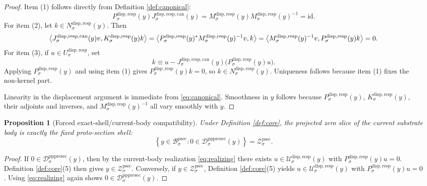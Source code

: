 \documentclass[11pt]{article}
\newcommand{\ProtoSectionBody}[1]{\mathcal B_{#1}^{\mathrm{psec}}}
\newcommand{\ProtoSectionShell}[1]{\mathcal Z_{#1}^{\mathrm{psec}}}
\newcommand{\PrePreProtoSectionResidualBody}[1]{\mathcal D_{#1}^{\mathrm{pppresec}}}
\newcommand{\SubstrateCarrier}[1]{U_{#1}^{\mathrm{disp,resp}}}
\newcommand{\SubstrateBody}[1]{\mathcal U_{#1}^{\mathrm{disp,resp}}}
\newcommand{\SubstrateProjection}[1]{P_{#1}^{\mathrm{disp,resp}}}
\newcommand{\SubstrateOperator}[1]{K_{#1}^{\mathrm{disp,resp}}}
\newcommand{\SubstrateKernel}[1]{N_{#1}^{\mathrm{disp,resp}}}
\newcommand{\CanonicalLift}[1]{J_{#1}^{\mathrm{disp,resp,can}}}
\newcommand{\SchurResponse}[1]{M_{#1}^{\mathrm{disp,resp}}}
\newtheorem{proposition}{Proposition}
\begin{document}
\begin{proof}
Item (1) follows directly from Definition \ref{def:canonical}:
\[
\SubstrateProjection{\sigma}(y)\CanonicalLift{\sigma}(y)
=
\SchurResponse{\sigma}(y)\SchurResponse{\sigma}(y)^{-1}
=
\mathrm{id}.
\]
For item (2), let \(k\in\SubstrateKernel{\sigma}(y)\). Then
\[
\ev{
\CanonicalLift{\sigma}(y)v,
\SubstrateOperator{\sigma}(y)k
}
=
\ev{
\SubstrateProjection{\sigma}(y)^*
\SchurResponse{\sigma}(y)^{-1}v,
k
}
=
\ev{
\SchurResponse{\sigma}(y)^{-1}v,
\SubstrateProjection{\sigma}(y)k
}
=
0.
\]
For item (3), if \(u\in\SubstrateCarrier{\sigma}\), set
\[
k
\equiv
u-\CanonicalLift{\sigma}(y)\bigl(\SubstrateProjection{\sigma}(y)u\bigr).
\]
Applying \(\SubstrateProjection{\sigma}(y)\) and using item (1) gives \(\SubstrateProjection{\sigma}(y)k=0\), so \(k\in\SubstrateKernel{\sigma}(y)\). Uniqueness follows because item (1) fixes the non-kernel part.

Linearity in the displacement argument is immediate from \eqref{eq:canonical}. Smoothness in \(y\) follows because \(\SubstrateProjection{\sigma}(y)\), \(\SubstrateOperator{\sigma}(y)\), their adjoints and inverses, and \(\SchurResponse{\sigma}(y)^{-1}\) all vary smoothly with \(y\).
\end{proof}

\begin{proposition}[Forced exact-shell/current-body compatibility]
\label{prop:compat}
Under Definition \ref{def:core}, the projected zero slice of the current substrate body is exactly the fixed proto-section shell:
\[
\left\{
y\in\ProtoSectionBody{\sigma}:0\in\PrePreProtoSectionResidualBody{\sigma}(y)
\right\}
=
\ProtoSectionShell{\sigma}.
\]
\end{proposition}

\begin{proof}
If \(0\in\PrePreProtoSectionResidualBody{\sigma}(y)\), then by the current-body realization \eqref{eq:realizing} there exists \(u\in\SubstrateBody{\sigma}(y)\) with \(\SubstrateProjection{\sigma}(y)u=0\). Definition \ref{def:core}(5) then gives \(y\in\ProtoSectionShell{\sigma}\). Conversely, if \(y\in\ProtoSectionShell{\sigma}\), Definition \ref{def:core}(5) yields \(u\in\SubstrateBody{\sigma}(y)\) with \(\SubstrateProjection{\sigma}(y)u=0\). Using \eqref{eq:realizing} again shows \(0\in\PrePreProtoSectionResidualBody{\sigma}(y)\).
\end{proof}
\end{document}
